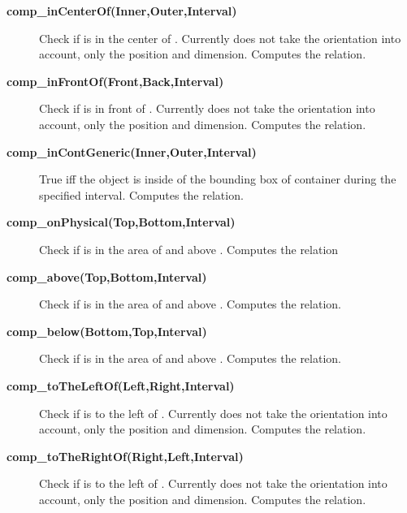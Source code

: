 \begin{description}
\item[\textbf{comp\_inCenterOf(Inner,Outer,Interval)}]
Check if  is in the center of .
Currently does not take the orientation into account, only the position and dimension.
Computes the  relation.

\item[\textbf{comp\_inFrontOf(Front,Back,Interval)}]
Check if  is in front of .
Currently does not take the orientation
into account, only the position and dimension.
Computes the  relation.

\item[\textbf{comp\_inContGeneric(Inner,Outer,Interval)}]
True iff the object  is inside 
of the bounding box of container  during
the specified interval.
Computes the  relation.

\item[\textbf{comp\_onPhysical(Top,Bottom,Interval)}]
Check if  is in the area of and above .
Computes the  relation

\item[\textbf{comp\_above(Top,Bottom,Interval)}]
Check if  is in the area of and above .
Computes the  relation.

\item[\textbf{comp\_below(Bottom,Top,Interval)}]
Check if  is in the area of and above .
Computes the  relation.

\item[\textbf{comp\_toTheLeftOf(Left,Right,Interval)}]
Check if  is to the left of .
Currently does not take the orientation
into account, only the position and dimension.
Computes the  relation.

\item[\textbf{comp\_toTheRightOf(Right,Left,Interval)}]
Check if  is to the left of .
Currently does not take the orientation
into account, only the position and dimension.
Computes the  relation.
\end{description}
